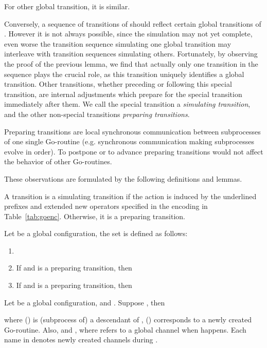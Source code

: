 \documentclass[runningheads, envcountsame, a4paper]{llncs}
\begin{document}
For other global transition, it is similar.

Conversely, a sequence of transitions of  should reflect certain global transitions of .
However it is not always possible, since the simulation may not yet complete, even worse
the transition sequence simulating one global transition may interleave with transition sequences simulating others.
Fortunately, by observing the proof of the previous lemma, we find that actually only one transition in the sequence
plays the crucial role, as this transition uniquely identifies a global transition.
Other  transitions, whether preceding or following this special transition, are internal adjustments
which prepare for the special transition immediately after them.
We call the special transition a \emph{simulating transition}, and the other non-special  transitions \emph{preparing transitions}.

Preparing transitions are local synchronous communication between subprocesses of one single Go-routine
(e.g. synchronous communication making subprocesses evolve in order).
To postpone or to advance preparing transitions would not affect the behavior of other Go-routines.

These observations are formulated by the following definitions and lemmas.

\begin{definition}
  A transition  is a simulating transition if the action  is induced by
  the underlined prefixes and extended new operators specified in the encoding in Table~\ref{tab:goenc}.
  Otherwise, it is a preparing transition.
  \label{def:gosim}
\end{definition}

\begin{definition}
  Let  be a global configuration, the set  is defined as follows:
  \begin{enumerate} \setlength{\itemsep}{0ex}
    \item 
    \item If  and  is a preparing transition, then 
    \item If  and  is a preparing transition, then 
  \end{enumerate}
  \label{def:gotsset}
\end{definition}

\begin{proposition}
  Let  be a global configuration, and . Suppose , then
  
  where  () is (subprocess of) a descendant of ,  () corresponds to a newly created Go-routine.
  Also,  and ,
  where  refers to a global channel when  happens.
  Each name in  denotes newly created channels during .
  \label{prop:gosimstru}
\end{proposition}
\end{document}
